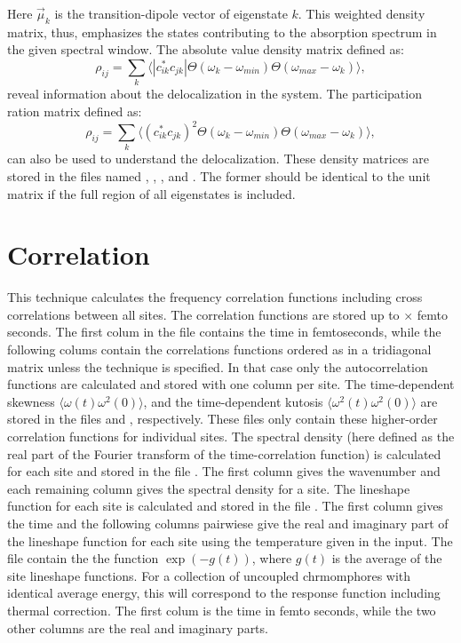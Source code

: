 Here $\vec{\mu}_k$ is the transition-dipole vector of eigenstate $k$.
This weighted density matrix, thus, emphasizes the states contributing to the absorption spectrum in the given spectral window.
The absolute value density matrix defined as:
\begin{equation}
	\rho_{ij}=\sum_k \Big\langle |c_{ik}^* c_{jk}|  \Theta(\omega_{k}-\omega_{min})\Theta(\omega_{max}-\omega_k)\Big\rangle,
\end{equation}
reveal information about the delocalization in the system.
The participation ration matrix defined as:
\begin{equation}
	\rho_{ij}=\sum_k \Big\langle (c_{ik}^* c_{jk})^2  \Theta(\omega_{k}-\omega_{min})\Theta(\omega_{max}-\omega_k)\Big\rangle,
\end{equation}
can also be used to understand the delocalization.
These density matrices are stored in the files named , , , and .
The former should be identical to the unit matrix if the full region of all eigenstates is included.

\section{Correlation}
This technique calculates the frequency correlation functions including cross correlations between all sites.
The correlation functions are stored up to $\times$ femto seconds.
The first colum in the file  contains the time in femtoseconds,
while the following colums contain the correlations functions ordered as in a tridiagonal matrix unless the technique  is specified.
In that case only the autocorrelation functions are calculated and stored with one column per site.
The time-dependent skewness $\langle \omega(t)\omega^2(0) \rangle$, and the time-dependent kutosis $\langle \omega^2(t)\omega^2(0) \rangle$ are stored in the files  and , respectively.
These files only contain these higher-order correlation functions for individual sites.
The spectral density (here defined as the real part of the Fourier transform of the time-correlation function) is calculated for each site and stored in the file .
The first column gives the wavenumber and each remaining column gives the spectral density for a site.
The lineshape function for each site is calculated and stored in the file .
The first column gives the time and the following columns pairwiese give the real and imaginary part of the lineshape function for each site using the temperature given in the input.
The file  contain the the function $\exp(-g(t))$, where $g(t)$ is the average of the site lineshape functions.
For a collection of uncoupled chrmomphores with identical average energy, this will correspond to the response function including thermal correction.
The first colum is the time in femto seconds, while the two other columns are the real and imaginary parts.

